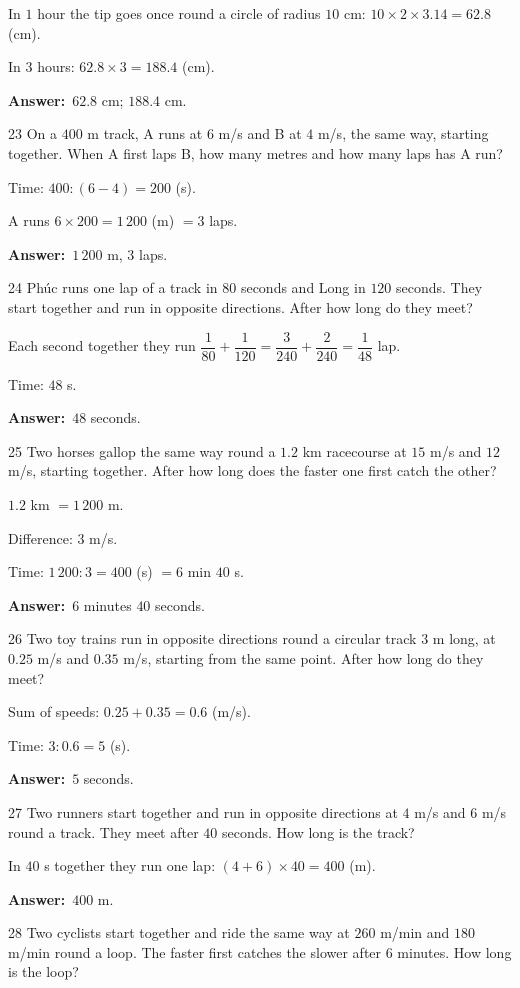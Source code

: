 \documentclass[11pt]{article}
\newif\ifsol \solfalse
\providecommand{\AnsWord}{Đáp số}
\newcommand{\dapso}[1]{\par\textbf{\AnsWord:}\ #1}
\newcommand{\probsol}[1]{%
  \begin{lrbox}{\solmeasure}\begin{minipage}{\dimexpr\linewidth-24pt\relax}#1\end{minipage}\end{lrbox}%
  \ifsol
    \begin{solbox}#1\end{solbox}%
  \else
    \setlength{\solht}{\dimexpr\ht\solmeasure+\dp\solmeasure+0.85cm\relax}%
    \ifdim\solht<1.35cm\setlength{\solht}{1.35cm}\fi
    \begin{tcolorbox}[colback=white,colframe=Line,boxrule=0.8pt,arc=5pt,
      left=8pt,right=8pt,top=4pt,bottom=4pt,height=\solht]{\footnotesize\color{Slate}\itshape\WorkWord}\end{tcolorbox}%
  \fi}
\newcommand{\gap}{\vspace{0.3cm}}
\def\WorkWord{Your work:}
\def\AnsWord{Answer}
\begin{document}
\probsol{
In $1$ hour the tip goes once round a circle of radius $10$ cm: $10\times2\times3.14=62.8$ (cm).\par
In $3$ hours: $62.8\times3=188.4$ (cm).
\dapso{$62.8$ cm; $188.4$ cm.}}
\gap
\begin{probbox}{23}{\relax}
On a $400$ m track, A runs at $6$ m/s and B at $4$ m/s, the same way, starting together. When A first laps B, how many metres and how many laps has A run?
\end{probbox}
\probsol{
Time: $400:(6-4)=200$ (s).\par A runs $6\times200=1\,200$ (m) $=3$ laps.
\dapso{$1\,200$ m, $3$ laps.}}
\gap
\begin{probbox}{24}{\relax}
Phúc runs one lap of a track in $80$ seconds and Long in $120$ seconds. They start together and run in opposite directions. After how long do they meet?
\end{probbox}
\probsol{
Each second together they run $\dfrac1{80}+\dfrac1{120}=\dfrac3{240}+\dfrac2{240}=\dfrac1{48}$ lap.\par Time: $48$ s.
\dapso{$48$ seconds.}}
\gap
\begin{probbox}{25}{\relax}
Two horses gallop the same way round a $1.2$ km racecourse at $15$ m/s and $12$ m/s, starting together. After how long does the faster one first catch the other?
\end{probbox}
\probsol{
$1.2$ km $=1\,200$ m.\par Difference: $3$ m/s.\par Time: $1\,200:3=400$ (s) $=6$ min $40$ s.
\dapso{$6$ minutes $40$ seconds.}}
\gap
\begin{probbox}{26}{\relax}
Two toy trains run in opposite directions round a circular track $3$ m long, at $0.25$ m/s and $0.35$ m/s, starting from the same point. After how long do they meet?
\end{probbox}
\probsol{
Sum of speeds: $0.25+0.35=0.6$ (m/s).\par Time: $3:0.6=5$ (s).
\dapso{$5$ seconds.}}
\gap
\begin{probbox}{27}{\relax}
Two runners start together and run in opposite directions at $4$ m/s and $6$ m/s round a track. They meet after $40$ seconds. How long is the track?
\end{probbox}
\probsol{
In $40$ s together they run one lap: $(4+6)\times40=400$ (m).
\dapso{$400$ m.}}
\gap
\begin{probbox}{28}{\relax}
Two cyclists start together and ride the same way at $260$ m/min and $180$ m/min round a loop. The faster first catches the slower after $6$ minutes. How long is the loop?
\end{probbox}
\end{document}
